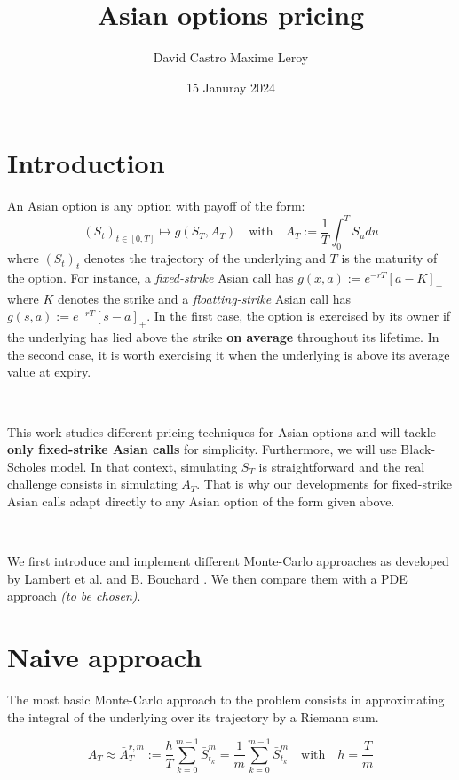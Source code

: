 \documentclass{article}
\title{Asian options pricing}
\author{David Castro \qquad Maxime Leroy}
\date{15 Januray 2024}
\begin{document}
\maketitle

\section*{Introduction}

An Asian option is any option with payoff of the form:
\[
	\left( S_t \right)_{t \in [0, T]} \mapsto g \left( S_T, A_T \right) \quad \text{with} \quad A_T := \frac{1}{T} \int_0^T S_u du
\]
where $\left( S_t \right)_t$ denotes the trajectory of the underlying and $T$ is the maturity of the option.
For instance, a \textit{fixed-strike} Asian call has $g(x, a) := e^{-rT} \left[ a - K \right]_+$ where $K$ denotes the strike
and a \textit{floatting-strike} Asian call has $g(s, a) := e^{-rT}  \left[ s - a \right]_+$.
In the first case, the option is exercised by its owner
if the underlying has lied above the strike \textbf{on average} throughout its lifetime. In the second case,
it is worth exercising it when the underlying is above its average value at expiry.

\

This work studies different pricing techniques for Asian options and will tackle \textbf{only fixed-strike Asian calls}
for simplicity. Furthermore, we will use Black-Scholes model. In that context, simulating $S_T$ is straightforward
and the real challenge consists in simulating $A_T$. That is why our developments for fixed-strike Asian calls
adapt directly to any Asian option of the form given above.

\

We first introduce and implement different Monte-Carlo approaches as developed by Lambert et al. \cite{main}
and B. Bouchard \cite{Bouchard}. We then compare them with a PDE approach \textit{(to be chosen)}.

\section{Naive approach}

The most basic Monte-Carlo approach to the problem consists in approximating the integral
of the underlying over its trajectory by a Riemann sum.

\[
	A_T \approx \bar A_T^{r, m} := \frac{h}{T} \sum_{k=0}^{m-1} \bar S_{t_k}^m
	= \frac{1}{m} \sum_{k=0}^{m-1} \bar S_{t_k}^m \quad \text{with} \quad h = \frac{T}{m}
\]
\end{document}
